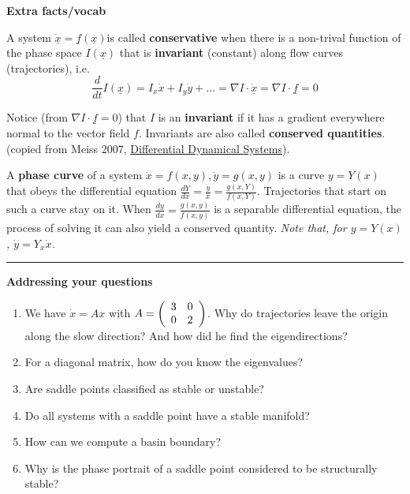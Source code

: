 \documentclass[12pt,letterpaper,noanswers]{exam}
\begin{document}
\noindent\textbf{Extra facts/vocab}

\begin{tcolorbox}
A system $\underline{\dot x} = \underline{f}(\underline{x})$is called \textbf{conservative} when there is a non-trival function of the phase space $I(\underline{x})$ that is \textbf{invariant} (constant) along flow curves (trajectories), i.e. \[\frac{d}{dt}I(\underline{x}) = I_x \dot x + I_y \dot y + ... = \nabla I \cdot \underline{\dot x} = \nabla I \cdot \underline{f} = 0\] 

Notice (from $\nabla I \cdot \underline f = 0$) that $I$ is an \textbf{invariant} if it has a gradient everywhere normal to the vector field $f$.  Invariants are also called \textbf{conserved quantities}.  (copied from Meiss 2007, \underline{Differential Dynamical Systems}).

A \textbf{phase curve} of a system $\dot x = f(x,y), \dot y = g(x,y)$ is a curve $y = Y(x)$ that obeys the differential equation $\frac{dY}{dx} = \frac{\dot y}{\dot x} = \frac{g(x,Y)}{f(x,Y)}$.  Trajectories that start on such a curve stay on it.  When $\frac{dy}{dx} = \frac{g(x,y)}{f(x,y)}$ is a separable differential equation, the process of solving it can also yield a conserved quantity.  \emph{Note that, for $y = Y(x)$, $\dot y = Y_x \dot x$.}
\end{tcolorbox}

\vspace{0.2cm}
\hrule
\vspace{0.2cm}

\noindent\textbf{Addressing your questions}

\begin{enumerate}
    \item We have $\dot x = Ax$ with $A = \left(\begin{array}{c c}3 & 0 \\ 0 & 2 \end{array}\right)$.  Why do trajectories leave the origin along the slow direction?  And how did he find the eigendirections?
    \item For a diagonal matrix, how do you know the eigenvalues?
    \item Are saddle points classified as stable or unstable?
    \item Do all systems with a saddle point have a stable manifold?
    \item How can we compute a basin boundary?
    \item Why is the phase portrait of a saddle point considered to be structurally stable?
\end{enumerate}
\end{document}
